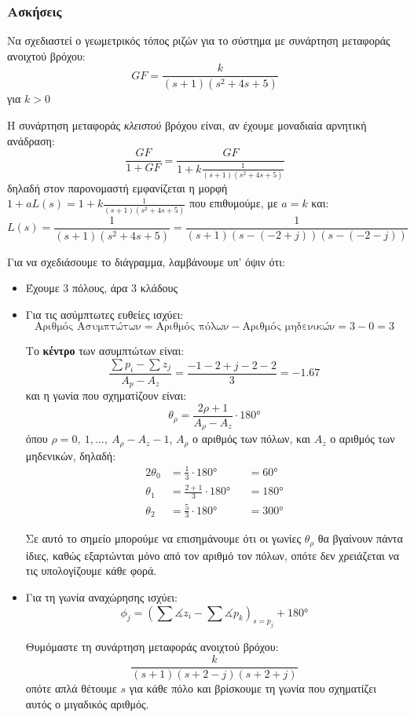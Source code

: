 \documentclass[11pt,a4paper,notitlepage,fleqn]{article}
\begin{document}
\subsubsection{Ασκήσεις}
\begin{exercise}
	Να σχεδιαστεί ο γεωμετρικός τόπος ριζών για το σύστημα με συνάρτηση μεταφοράς ανοιχτού βρόχου:
	\[
	GF = \frac{k}{(s+1)(s^2+4s+5)}
	\]
	για \( k>0 \)
	
	\tcblower
	
	Η συνάρτηση μεταφοράς \textit{κλειστού} βρόχου είναι, αν έχουμε μοναδιαία αρνητική
	ανάδραση:
	\[
	\frac{GF}{1+GF} = \frac{GF}{1+k\frac{1}{(s+1)(s^2+4s+5)}}
	\]
	δηλαδή στον παρονομαστή εμφανίζεται η μορφή \( 1+aL(s) = 1+k\frac{1}{(s+1)(s^2+4s+5)} \) που επιθυμούμε, με \( a=k \) και:
	\[
	L(s) = \frac{1}{(s+1)(s^2+4s+5)} = \frac{1}{(s+1)\left( s-(-2+j) \right)\left(s-(-2-j)\right)}
	\]
	
	Για να σχεδιάσουμε το διάγραμμα, λαμβάνουμε υπ' όψιν ότι:
	\begin{itemize}
		\item Έχουμε 3 πόλους, άρα 3 κλάδους
		\item Για τις ασύμπτωτες ευθείες ισχύει:
		\[
		\text{Αριθμός Ασυμπτώτων} = \text{Αριθμός πόλων} - \text{Αριθμός μηδενικών} = 3-0 = 3
		\]
		
		Το \textbf{κέντρο} των ασυμπτώτων είναι:
		\[
		\frac{\sum p_i - \sum z_j}{A_p - A_z} = \frac{-1-2+j-2-2}{3} = -1.67
		\]
		και η γωνία που σχηματίζουν είναι:
		\[
		\theta_ρ = \frac{2ρ+1}{A_ρ-Α_z} \cdot \ang{180}
		\]
		όπου \( ρ = 0,\ 1,\dots,\ A_ρ-A_z-1 \), \( A_ρ \) ο αριθμός των πόλων, και \( A_z \) ο
		αριθμός των μηδενικών, δηλαδή:
		\begin{alignat*}{2}
		\theta_0 &= \frac{1}{3}\cdot\ang{180} &&= \ang{60} \\
		\theta_1 &= \frac{2+1}{3}\cdot\ang{180} &&= \ang{180} \\
		\theta_2 &= \frac{5}{3}\cdot\ang{180} &&= \ang{300}
		\end{alignat*}
		
		Σε αυτό το σημείο μπορούμε να επισημάνουμε ότι οι γωνίες \( \theta_ρ \) θα βγαίνουν
		πάντα ίδιες, καθώς εξαρτώνται μόνο από τον αριθμό τον πόλων, οπότε δεν
		χρειάζεται να τις υπολογίζουμε κάθε φορά.
		\item Για τη γωνία αναχώρησης ισχύει:
		\[
		\phi_j = \left( \sum \measuredangle z_i - \sum \measuredangle p_k \right)_{s=p_j}
		+\ang{180}
		\]
		
		Θυμόμαστε τη συνάρτηση μεταφοράς ανοιχτού βρόχου:
		\[
		\frac{k}{(s+1)(s+2-j)(s+2+j)}
		\]
		οπότε απλά θέτουμε \( s \) για κάθε πόλο και βρίσκουμε τη γωνία που σχηματίζει αυτός
		ο μιγαδικός αριθμός.
		

\end{itemize}
\end{exercise}
\end{document}

